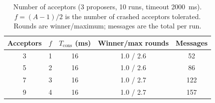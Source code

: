 \begin{table}[htbp]
\centering
\small
\begin{tabular}{c|c|c|c|c}
\hline
Acceptors & $f$ & $T_{\mathrm{cons}}$ (ms) & Winner/max rounds & Messages \\
\hline
3 & 1 & 16 & 1.0 / 2.6 & 52 \\
5 & 2 & 16 & 1.0 / 2.6 & 86 \\
7 & 3 & 16 & 1.0 / 2.7 & 122 \\
9 & 4 & 16 & 1.0 / 2.7 & 157 \\
\hline
\end{tabular}
\caption{Number of acceptors (3 proposers, 10 runs, timeout 2000~ms). $f=(A-1)/2$ is the number of crashed acceptors tolerated. Rounds are winner/maximum; messages are the total per run.}
\label{tab:acceptors}
\end{table}
